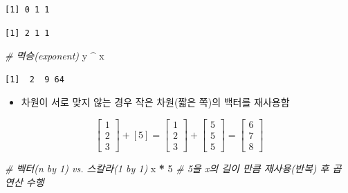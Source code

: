 \documentclass[
  11pt,
]{krantz}
\newenvironment{Shaded}{\begin{snugshade}}{\end{snugshade}}
\newcommand{\CommentTok}[1]{\textcolor[rgb]{0.37,0.37,0.37}{\textit{#1}}}
\newcommand{\DecValTok}[1]{\textcolor[rgb]{0.06,0.06,0.06}{#1}}
\newcommand{\NormalTok}[1]{#1}
\newcommand{\OperatorTok}[1]{\textcolor[rgb]{0.43,0.43,0.43}{\textbf{#1}}}
\newcommand{\StringTok}[1]{\textcolor[rgb]{0.5,0.5,0.5}{#1}}
\providecommand{\tightlist}{%
  \setlength{\itemsep}{0pt}\setlength{\parskip}{0pt}}
\begin{document}
\begin{verbatim}
[1] 0 1 1
\end{verbatim}

\begin{Shaded}
\end{Shaded}

\begin{verbatim}
[1] 2 1 1
\end{verbatim}

\begin{Shaded}
\begin{Highlighting}[]
\CommentTok{# 멱승(exponent)}
\NormalTok{y }\OperatorTok{^}\StringTok{ }\NormalTok{x}
\end{Highlighting}
\end{Shaded}

\begin{verbatim}
[1]  2  9 64
\end{verbatim}

\normalsize

\begin{itemize}
\tightlist
\item
  차원이 서로 맞지 않는 경우 작은 차원(짧은 쪽)의 백터를 재사용함
\end{itemize}

\[\begin{bmatrix}
1 \\ 2\\ 3
\end{bmatrix} + [5] = 
\begin{bmatrix}
1 \\ 2\\ 3
\end{bmatrix} + 
\begin{bmatrix}
5 \\ 5\\ 5
\end{bmatrix} = 
\begin{bmatrix}
6 \\ 7 \\ 8
\end{bmatrix}
\]

\footnotesize

\begin{Shaded}
\begin{Highlighting}[]
\CommentTok{# 벡터(n by 1) vs. 스칼라(1 by 1)}
\NormalTok{x }\OperatorTok{*}\StringTok{ }\DecValTok{5} \CommentTok{# 5을 x의 길이 만큼 재사용(반복) 후 곱 연산 수행}
\end{Highlighting}
\end{Shaded}
\end{document}
